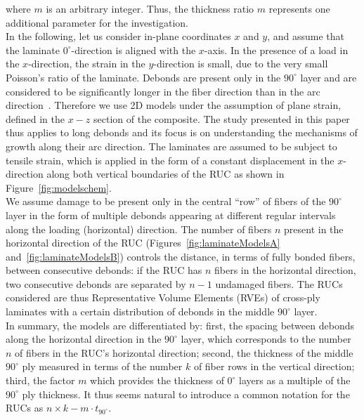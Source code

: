 \documentclass[review]{elsarticle}
\begin{document}
where $m$ is an arbitrary integer. Thus, the thickness ratio $m$ represents one additional parameter for the investigation.\\
In the following, let us consider in-plane coordinates $x$ and $y$, and assume that the laminate $0^{\circ}$-direction is aligned with the $x$-axis. In the presence of a load in the $x$-direction, the strain in the $y$-direction is small, due to the very small Poisson's ratio of the laminate. Debonds are present only in the $90^{\circ}$ layer and are considered to be significantly longer in the fiber direction than in the arc direction~\cite{Zhang1997}. Therefore we use 2D models under the assumption of plane strain, defined in the $x-z$ section of the composite. The study presented in this paper thus applies to long debonds and its focus is on understanding the mechanisms of growth along their arc direction. The laminates are assumed to be subject to tensile strain, which is applied in the form of a constant displacement in the $x$-direction along both vertical boundaries of the RUC as shown in  Figure~\ref{fig:modelschem}.\\
We assume damage to be present only in the central ``row'' of fibers of the $90^{\circ}$ layer in the form of multiple debonds appearing at different regular intervals along the loading (horizontal) direction. The number of fibers $n$ present in the horizontal direction of the RUC (Figures~\ref{fig:laminateModelsA} and~\ref{fig:laminateModelsB}) controls the distance, in terms of fully bonded fibers, between consecutive debonds: if the RUC has $n$ fibers in the horizontal direction, two consecutive debonds are separated by $n-1$ undamaged fibers. The RUCs considered are thus Representative Volume Elements (RVEs) of cross-ply laminates with a certain distribution of debonds in the middle $90^{\circ}$ layer.\\
In summary, the models are differentiated by: first, the spacing between debonds along the horizontal direction in the $90^{\circ}$ layer, which corresponds to the number $n$ of fibers in the RUC's horizontal direction; second, the thickness of the middle $90^{\circ}$ ply measured in terms of the number $k$ of fiber rows in the vertical direction; third, the factor $m$ which provides the thickness of $0^{\circ}$ layers as a multiple of the $90^{\circ}$ ply thickness. It thus seems natural to introduce a common notation for the RUCs as $n\times k-m\cdot t_{90^{\circ}}$.\\
\end{document}
